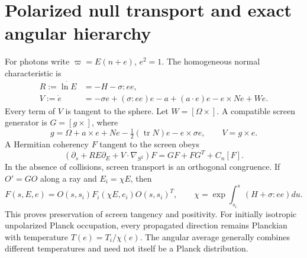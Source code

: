 \section{Polarized null transport and exact angular hierarchy}

For photons write $\varpi=E(n+e)$, $e^2=1$. The homogeneous normal characteristic is
\begin{align}
 R:=\dot{\ln E}&=-H-\sigma:ee,\nonumber\\
 V:=\dot e&=-\sigma e+(\sigma:ee)e-a+(a\cdot e)e-e\times Ne+We.
 \label{ii:photon_characteristic}
\end{align}
Every term of $V$ is tangent to the sphere. Let $W=[\Omega\times]$. A compatible screen generator is $G=[g\times]$, where
\begin{equation}
 g=\Omega+a\times e+Ne-\tfrac12(\operatorname{tr}N)e-e\times\sigma e,
 \qquad V=g\times e.
 \label{ii:screen_generator}
\end{equation}
A Hermitian coherency $F$ tangent to the screen obeys
\begin{equation}
 (\partial_s+RE\partial_E+V\cdot\nabla_{S^2})F
                  =GF+FG^T+C_n[F].
 \label{ii:coherency_transport}
\end{equation}
In the absence of collisions, screen transport is an orthogonal congruence. If $O'=GO$ along a ray and $E_i=\chi E$, then
\begin{equation}
 F(s,E,e)=O(s,s_i)F_i(\chi E,e_i)O(s,s_i)^T,
 \qquad
 \chi=\exp\!\int_{s_i}^{s}(H+\sigma:ee)du.
 \label{ii:characteristic_solution}
\end{equation}
This proves preservation of screen tangency and positivity. For initially isotropic unpolarized Planck occupation, every propagated direction remains Planckian with temperature $T(e)=T_i/\chi(e)$. The angular average generally combines different temperatures and need not itself be a Planck distribution.

